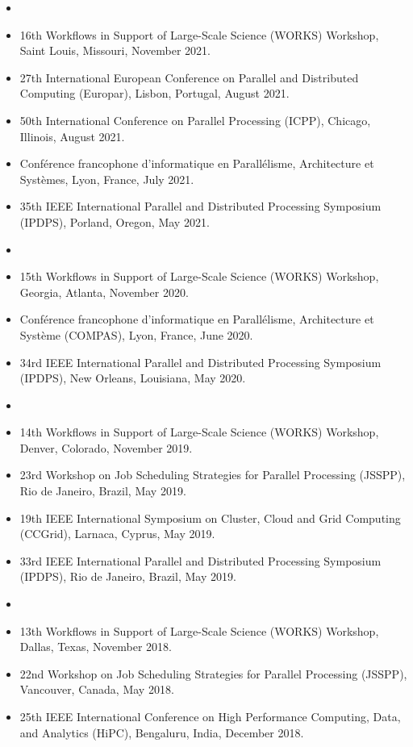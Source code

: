 \documentclass[times,11pt]{letter}
\begin{document}
\begin{itemize}
\item [2021]
\item  [--] 16th Workflows in Support of Large-Scale Science (WORKS) Workshop, Saint Louis, Missouri,  November 2021.
\item [--] 27th International European Conference on Parallel and Distributed Computing (Europar), Lisbon, Portugal, August 2021.
\item [--] 50th International Conference on Parallel Processing  (ICPP), Chicago, Illinois, August 2021.
\item [--] Conf\'erence francophone d'informatique en Parall\'elisme, Architecture et Syst\`emes, Lyon, France, July 2021.
\item [--] 35th IEEE International Parallel and Distributed Processing Symposium (IPDPS), Porland, Oregon, May 2021.

\item [2020]
\item [--] 15th Workflows in Support of Large-Scale Science (WORKS) Workshop, Georgia, Atlanta, November 2020.
\item [--] Conf\'erence francophone d'informatique en Parall\'elisme, Architecture et Syst\`eme (COMPAS), Lyon, France, June 2020.
\item [--] 34rd IEEE International Parallel and Distributed Processing Symposium (IPDPS), New Orleans, Louisiana, May 2020.

\item [2019]
\item[--]  14th Workflows in Support of Large-Scale Science (WORKS) Workshop, Denver, Colorado, November 2019.
\item[--]  23rd Workshop on Job Scheduling Strategies for Parallel Processing (JSSPP), Rio de Janeiro, Brazil, May 2019.
\item[--]  19th IEEE International Symposium on Cluster, Cloud and Grid Computing (CCGrid), Larnaca, Cyprus, May 2019.
\item[--]  33rd IEEE International Parallel and Distributed Processing Symposium (IPDPS), Rio de Janeiro, Brazil, May 2019.

\item [2018]
\item[--]  13th Workflows in Support of Large-Scale Science (WORKS) Workshop, Dallas, Texas, November 2018.
\item[--]  22nd Workshop on Job Scheduling Strategies for Parallel Processing (JSSPP), Vancouver, Canada, May 2018.
\item[--]  25th IEEE International Conference on High Performance Computing, Data, and Analytics (HiPC), Bengaluru, India, December 2018.


\end{itemize}
\end{document}
